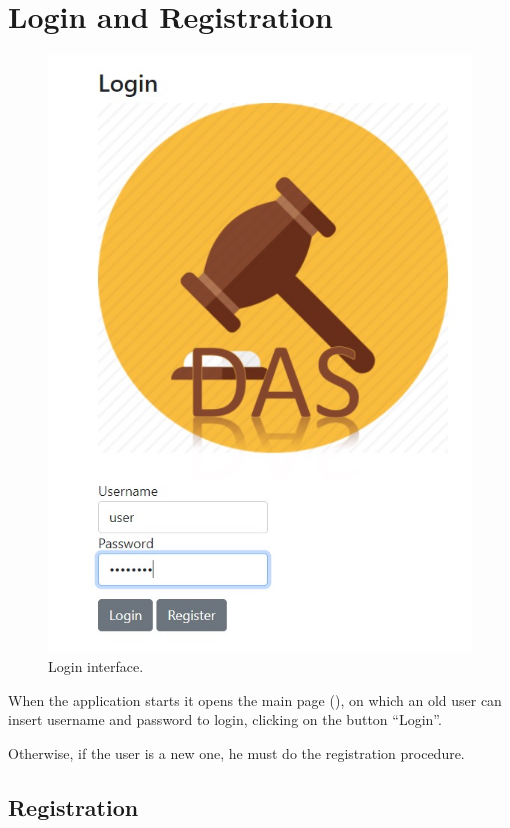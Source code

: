 \section{Login and Registration}

\begin{figure}[H]
	\includegraphics[width=\textwidth]{img/login.jpg}
	\caption{Login interface.}\label{fig:login}
\end{figure}

When the application starts it opens the main page (), on
which an old user can insert username and password to login, clicking on the
button ``Login''.

Otherwise, if the user is a new one, he must do the registration procedure.

\subsection{Registration}

